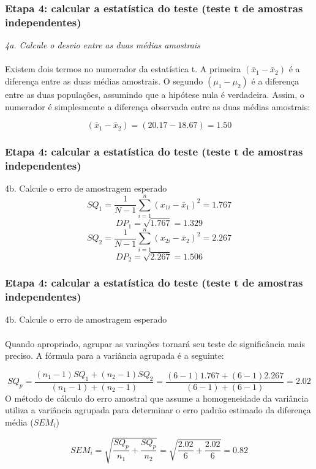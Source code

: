 \documentclass[11pt]{beamer}
\begin{document}
\begin{frame}
\frametitle{Etapa 4: calcular a estatística do teste (teste t de amostras independentes)}
\textit{4a. Calcule o desvio entre as duas médias amostrais}\\~\\

Existem dois termos no numerador da estatística t. A primeira $(\bar{x}_1 - \bar{x}_2)$ é a diferença entre as duas médias amostrais. O segundo $(\mu_1 - \mu_2)$ é a diferença entre as duas populações, assumindo que a hipótese nula é verdadeira. Assim, o numerador é simplesmente a diferença observada entre as duas médias amostrais:

\[(\bar{x}_1 - \bar{x}_2) = ( 20.17 - 18.67) = 1.50\]

\end{frame}

\begin{frame}
\frametitle{Etapa 4: calcular a estatística do teste (teste t de amostras independentes)}
4b. Calcule o erro de amostragem esperado
\[SQ_1 = \frac{1}{N-1}\sum_{i=1}^n(x_{1i} - \bar{x}_1)^2 = 1.767\]
\[DP_1 = \sqrt{1.767} = 1.329\]
\[SQ_2 = \frac{1}{N-1}\sum_{i=1}^n(x_{2i} - \bar{x}_2)^2 = 2.267\]
\[DP_2 = \sqrt{2.267} = 1.506\]

\end{frame}

\begin{frame}
\frametitle{Etapa 4: calcular a estatística do teste (teste t de amostras independentes)}
4b. Calcule o erro de amostragem esperado\\~\\
Quando apropriado, agrupar as variações tornará seu teste de significância mais preciso. A fórmula para a variância agrupada é a seguinte:

\[SQ_p = \frac{(n_1-1)SQ_1+(n_2-1)SQ_2}{(n_1-1)+(n_2-1)} = \frac{(6-1)1.767+(6-1)2.267}{(6-1)+(6-1)}=2.02\]
O método de cálculo do erro amostral que assume a homogeneidade da variância utiliza a variância agrupada para determinar o erro padrão estimado da diferença média ($SEM_i$)

\[SEM_i = \sqrt{\frac{SQ_p}{n_1}+\frac{SQ_p}{n_2}} = \sqrt{\frac{2.02}{6}+\frac{2.02}{6}} = 0.82\]

\end{frame}
\end{document}
